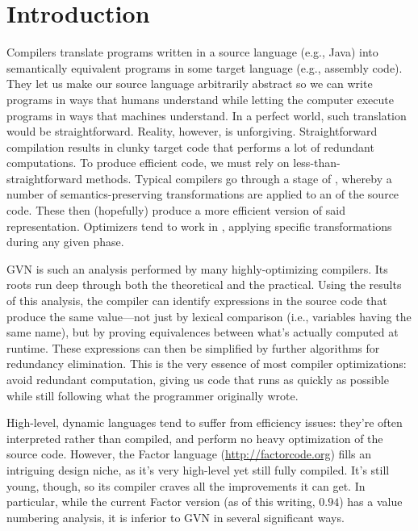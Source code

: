 \chapter{Introduction}\label{sec:intro}

Compilers translate programs written in a source language (e.g., Java) into
semantically equivalent programs in some target language (e.g., assembly code).
They let us make our source language arbitrarily abstract so we can write
programs in ways that humans understand while letting the computer execute
programs in ways that machines understand.  In a perfect world, such
translation would be straightforward.  Reality, however, is unforgiving.
Straightforward compilation results in clunky target code that performs a lot
of redundant computations.  To produce efficient code, we must rely on
less-than-straightforward methods.  Typical compilers go through a stage of
, whereby a number of semantics-preserving transformations
are applied to an  of the source code.  These then
(hopefully) produce a more efficient version of said representation.
Optimizers tend to work in , applying specific transformations
during any given phase.

\Gls{GVN} is such an analysis performed by many highly-optimizing compilers.
Its roots run deep through both the theoretical and the practical.  Using the
results of this analysis, the compiler can identify expressions in the source
code that produce the same value---not just by lexical comparison (i.e.,
variables having the same name), but by proving equivalences between what's
actually computed at runtime.  These expressions can then be simplified by
further algorithms for redundancy elimination.  This is the very essence of
most compiler optimizations: avoid redundant computation, giving us code that
runs as quickly as possible while still following what the programmer
originally wrote.

High-level, dynamic languages tend to suffer from efficiency issues: they're
often interpreted rather than compiled, and perform no heavy optimization of
the source code.  However, the Factor language (\url{http://factorcode.org})
fills an intriguing design niche, as it's very high-level yet still fully
compiled.  It's still young, though, so its compiler craves all the
improvements it can get.  In particular, while the current Factor version (as
of this writing, $0.94$) has a  value numbering analysis, it is
inferior to \gls{GVN} in several significant ways.


